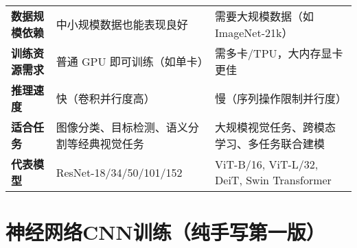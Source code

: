 \documentclass[UTF8]{report}
\theoremstyle{MyLineTheoremStyle} %
\theoremstyle{MyBlockTheoremStyle} %
\theoremstyle{MySubsubsectionStyle} %
\begin{document}
\begin{longtable}{@{}p{}p{}p{}@{}}
\textbf{数据规模依赖}       & 中小规模数据也能表现良好                       & 需要大规模数据（如 ImageNet-21k）           \\
\textbf{训练资源需求}       & 普通 GPU 即可训练（如单卡）                    & 需多卡/TPU，大内存显卡更佳                  \\
\textbf{推理速度}           & 快（卷积并行度高）                             & 慢（序列操作限制并行度）                     \\
\textbf{适合任务}           & 图像分类、目标检测、语义分割等经典视觉任务     & 大规模视觉任务、跨模态学习、多任务联合建模   \\
\textbf{代表模型}           & ResNet-18/34/50/101/152                        & ViT-B/16, ViT-L/32, DeiT, Swin Transformer    \\
\bottomrule
\end{longtable}






\section{神经网络CNN训练（纯手写第一版）}
\end{document}
